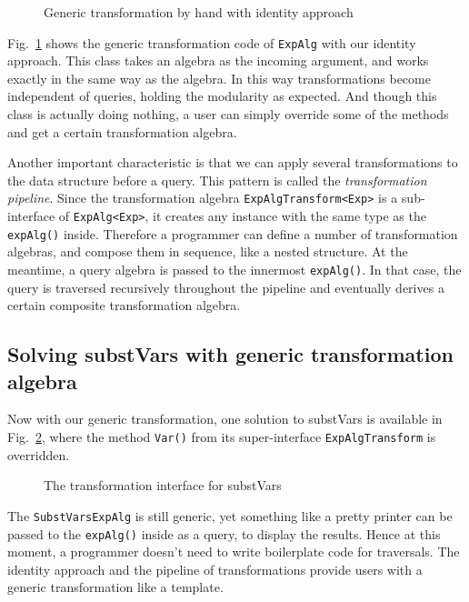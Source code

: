 \begin{figure}[!htbp]
\vspace{-.1in}
\caption{Generic transformation by hand with identity approach}
\label{generic_transform}
\end{figure}

Fig.~\ref{generic_transform} shows the generic transformation code of \lstinline{ExpAlg} with our identity approach. This class takes an algebra as the incoming argument, and works exactly in the same way as the algebra. In this way transformations become independent of queries, holding the modularity as expected. And though this class is actually doing nothing, a user can simply override some of the methods and get a certain transformation algebra.

Another important characteristic is that we can apply several transformations to the data structure before a query. This pattern is called the \textit{transformation pipeline}. Since the transformation algebra \lstinline{ExpAlgTransform<Exp>} is a sub-interface of \lstinline{ExpAlg<Exp>}, it creates any instance with the same type as the \lstinline{expAlg()} inside. Therefore a programmer can define a number of transformation algebras, and compose them in sequence, like a nested structure. At the meantime, a query algebra is passed to the innermost \lstinline{expAlg()}. In that case, the query is traversed recursively throughout the pipeline and eventually derives a certain composite transformation algebra.

\subsection{Solving substVars with generic transformation algebra}\label{subsec:solvingsubst}

Now with our generic transformation, one solution to substVars is available in Fig.~\ref{substvars_with_id}, where the method \lstinline{Var()} from its super-interface \lstinline{ExpAlgTransform} is overridden.

\begin{figure}[!htbp]
\vspace{-.1in}
\caption{The transformation interface for substVars}
\label{substvars_with_id}
\end{figure}

The \lstinline{SubstVarsExpAlg} is still generic, yet something like a pretty printer can be passed to the \lstinline{expAlg()} inside as a query, to display the results. Hence at this moment, a programmer doesn't need to write boilerplate code for traversals. The identity approach and the pipeline of transformations provide users with a generic transformation like a template.
